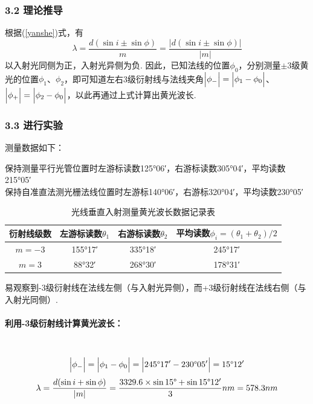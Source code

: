 \documentclass[UTF8]{ctexart}
\begin{document}
\subsubsection*{3.2 理论推导}
根据(\ref{yanshe})式，有
\begin{equation}
    \lambda=\frac{d(\sin i\pm \sin \phi)}{m}=\frac{|d(\sin i\pm \sin \phi)|}{|m|}
\end{equation}
以入射光同侧为正，入射光异侧为负. 因此，已知法线的位置$\phi_0$，分别测量$\pm3$级黄光的位置$\phi_1$、$\phi_2$，即可知道左右3级衍射线与法线夹角$\Big{|}\phi_-\Big{|}=\Big{|}\phi_1-\phi_0\Big{|}$、$\Big{|}\phi_+\Big{|}=\Big{|}\phi_2-\phi_0\Big{|}$，以此再通过上式计算出黄光波长.

\subsubsection*{3.3 进行实验}
测量数据如下：\\
\begin{center}
    保持测量平行光管位置时左游标读数125°06′，右游标读数305°04′，平均读数215°05′\\
    保持自准直法测光栅法线位置时左游标140°06′，右游标320°04′，平均读数230°05′\vspace{-1em}
\end{center}
\begin{table}[H]\begin{center}
    \caption{光线垂直入射测量黄光波长数据记录表}
    \begin{tabular}{|c|c|c|c|}
        \hline
        衍射线级数&左游标读数$\theta_1$&右游标读数$\theta_2$&平均读数$\phi_i=(\theta_1+\theta_2)/2$\\
        \hline
        $m=-3$&155°17′&335°18′&245°17′\\
        \hline
        $m=3$&88°32′&268°30′&178°31′\\
        \hline        
    \end{tabular}
\end{center}\end{table}
易观察到-3级衍射线在法线左侧（与入射光异侧），而+3级衍射线在法线右侧（与入射光同侧）.\\
\paragraph{利用-3级衍射线计算黄光波长：}\quad\\
\[\Big{|}\phi_-\Big{|}=\Big{|}\phi_1-\phi_0\Big{|}=\Big{|}245\degree17'-230\degree05'\Big{|}=15\degree12'\]
\[\lambda=\frac{d(\sin i+ \sin \phi)}{|m|}=\frac{3329.6\times\sin15\degree+\sin15\degree12'}{3}nm=578.3nm\]
\end{document}
